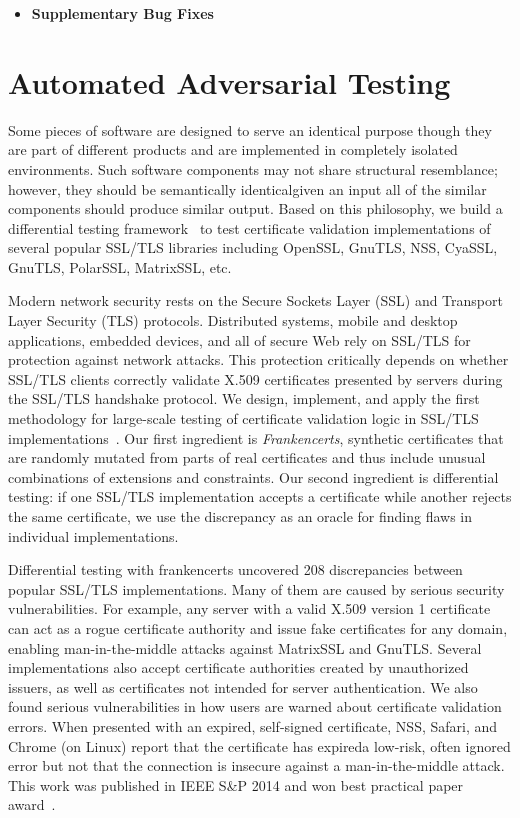 \documentclass[a4paper, 11pt]{article}
\begin{document}
\begin{small}
\begin{itemize}
  \item{\textbf{Supplementary Bug Fixes}}
     
\end{itemize}


\section*{\large Automated Adversarial Testing}

Some pieces of software are designed to serve an identical purpose though they are part of
different products and are implemented in completely isolated environments. Such software
components may not share structural resemblance; however, they should be semantically
identical\textemdash given an input all of the similar components should produce similar
output.  Based on this philosophy, we build a differential testing
framework~\cite{KeemanDifferentialTesting1998} to test certificate validation implementations
of several popular SSL/TLS libraries including OpenSSL, GnuTLS, NSS, CyaSSL, GnuTLS, PolarSSL,
MatrixSSL, etc.

Modern network security rests on the Secure Sockets Layer (SSL) and Transport Layer Security
(TLS) protocols.  Distributed systems, mobile and desktop applications, embedded devices, and
all of secure Web rely on SSL/TLS for protection against network attacks.  This protection
critically depends on whether SSL/TLS clients correctly validate X.509 certificates presented
by servers during the SSL/TLS handshake protocol.  We design, implement, and apply the first
methodology for large-scale testing of certificate validation logic in SSL/TLS
implementations~\cite{brubaker2014using}.  Our first ingredient is {\em Frankencerts},
synthetic certificates that are randomly mutated from parts of real certificates and thus
include unusual combinations of extensions and constraints.  Our second ingredient is
differential testing: if one SSL/TLS implementation accepts a certificate while another rejects
the same certificate, we use the discrepancy as an oracle for finding flaws in individual
implementations.


Differential testing with frankencerts uncovered 208 discrepancies between popular SSL/TLS
implementations. Many of them are caused by serious security vulnerabilities.  For example, any
server with a valid X.509 version 1 certificate can act as a rogue certificate authority and
issue fake certificates for any domain, enabling man-in-the-middle attacks against MatrixSSL
and GnuTLS.  Several implementations also accept certificate authorities created by
unauthorized issuers, as well as certificates not intended for server authentication. We also
found serious vulnerabilities in how users are warned about certificate validation errors.
When presented with an expired, self-signed certificate, NSS, Safari, and Chrome (on Linux)
report that the certificate has expired\textemdash a low-risk, often ignored error\textemdash
but not that the connection is insecure against a man-in-the-middle attack. This work was
published in IEEE S\&P 2014 and won best practical paper award~\cite{brubaker2014using}.


\end{small}
\end{document}
